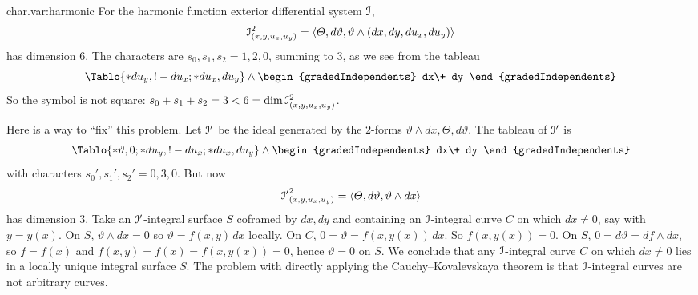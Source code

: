 \begin{answer}{char.var:harmonic}
For the harmonic function exterior differential system \(\mathcal{I}\),
\[
\mathcal{I}^2_{(x,y,u_x,u_y)}
=
\left<\Theta,d\vartheta,\vartheta\wedge(dx,dy,du_x,du_y)\right>
\]
has dimension 6.
The characters are \(s_0,s_1,s_2=1,2,0\), summing to \(3\), as we see from the tableau
\[
\Tablo{*du_y,!-du_x;*du_x,du_y}
\wedge
\begin{gradedIndependents}
dx\+
dy
\end{gradedIndependents}
\]
So the symbol is not square: \(s_0+s_1+s_2=3<6=\dim\mathcal{I}^2_{(x,y,u_x,u_y)}\).

Here is a way to ``fix'' this problem.
Let \(\mathcal{I}'\) be the ideal generated by the \(2\)-forms \(\vartheta\wedge dx,\Theta,d\vartheta\).
The tableau of \(\mathcal{I}'\) is
\[
\Tablo{
*\vartheta,0;*du_y,!-du_x;*du_x,du_y}
\wedge
\begin{gradedIndependents}
dx\+
dy
\end{gradedIndependents}
\]
with characters \(s_0',s_1',s_2'=0,3,0\).
But now 
\[
{\mathcal{I}'}^2_{(x,y,u_x,u_y)}
=
\left<\Theta,d\vartheta,\vartheta\wedge dx\right>
\]
has dimension \(3\).
Take an \(\mathcal{I}'\)-integral surface \(S\) coframed by \(dx,dy\) and containing an \(\mathcal{I}\)-integral curve \(C\) on which \(dx\ne 0\), say with \(y=y(x)\).
On \(S\), \(\vartheta\wedge dx=0\) so \(\vartheta=f(x,y)\,dx\) locally.
On \(C\), \(0=\vartheta=f(x,y(x))\,dx\).
So \(f(x,y(x))=0\).
On \(S\), \(0=d\vartheta=df\wedge dx\), so \(f=f(x)\) and \(f(x,y)=f(x)=f(x,y(x))=0\), hence \(\vartheta=0\) on \(S\).
We conclude that any \(\mathcal{I}\)-integral curve \(C\) on which \(dx\ne 0\) lies in a locally unique integral surface \(S\).
The problem with directly applying the Cauchy--Kovalevskaya theorem is that \(\mathcal{I}\)-integral curves are not arbitrary curves.
\end{answer}
